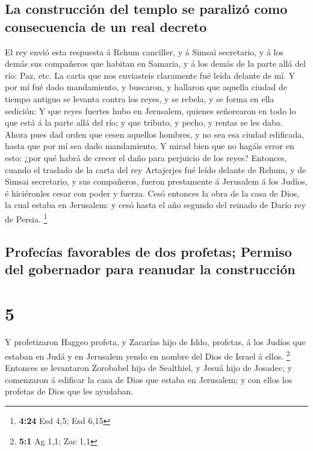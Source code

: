 \hypertarget{la-construcciuxf3n-del-templo-se-paralizuxf3-como-consecuencia-de-un-real-decreto}{%
\subsection{La construcción del templo se paralizó como consecuencia de
un real
decreto}\label{la-construcciuxf3n-del-templo-se-paralizuxf3-como-consecuencia-de-un-real-decreto}}

 El rey envió esta respuesta á Rehum canciller, y á Simsai
secretario, y á los demás sus compañeros que habitan en Samaria, y á los
demás de la parte allá del río: Paz, etc.  La carta que nos
enviasteis claramente fué leída delante de mí.  Y por mí
fué dado mandamiento, y buscaron, y hallaron que aquella ciudad de
tiempo antiguo se levanta contra los reyes, y se rebela, y se forma en
ella sedición:  Y que reyes fuertes hubo en Jerusalem,
quienes señorearon en todo lo que está á la parte allá del río; y que
tributo, y pecho, y rentas se les daba.  Ahora pues dad
orden que cesen aquellos hombres, y no sea esa ciudad edificada, hasta
que por mí sea dado mandamiento.  Y mirad bien que no
hagáis error en esto: ¿por qué habrá de crecer el daño para perjuicio de
los reyes?  Entonces, cuando el traslado de la carta del
rey Artajerjes fué leído delante de Rehum, y de Simsai secretario, y sus
compañeros, fueron prestamente á Jerusalem á los Judíos, é hiciéronles
cesar con poder y fuerza.  Cesó entonces la obra de la casa
de Dios, la cual estaba en Jerusalem: y cesó hasta el año segundo del
reinado de Darío rey de Persia. \footnote{\textbf{4:24} Esd 4,5; Esd
  6,15}

\hypertarget{profecuxedas-favorables-de-dos-profetas-permiso-del-gobernador-para-reanudar-la-construcciuxf3n}{%
\subsection{Profecías favorables de dos profetas; Permiso del gobernador
para reanudar la
construcción}\label{profecuxedas-favorables-de-dos-profetas-permiso-del-gobernador-para-reanudar-la-construcciuxf3n}}

\hypertarget{section-4}{%
\section{5}\label{section-4}}

 Y profetizaron Haggeo profeta, y Zacarías hijo de Iddo,
profetas, á los Judíos que estaban en Judá y en Jerusalem yendo en
nombre del Dios de Israel á ellos. \footnote{\textbf{5:1} Ag 1,1; Zac
  1,1}  Entonces se levantaron Zorobabel hijo de Sealthiel,
y Jesuá hijo de Josadec; y comenzaron á edificar la casa de Dios que
estaba en Jerusalem; y con ellos los profetas de Dios que les ayudaban.

